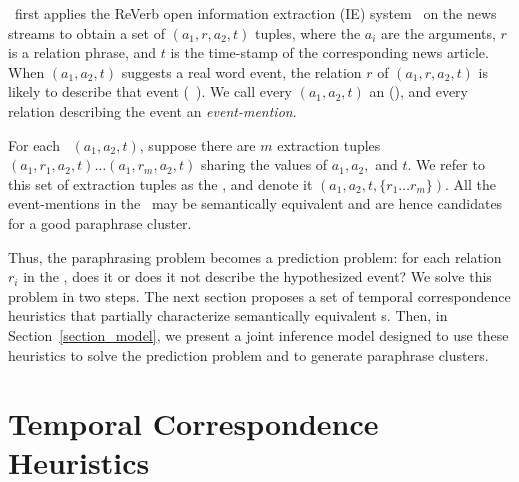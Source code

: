 

\sys\ first applies the ReVerb open information extraction (IE)
system~\cite{fader11} on the news streams to obtain a set of
$(a_1,r,a_2,t)$ tuples, where the $a_i$ are the arguments, $r$ is a
relation phrase, and $t$ is the time-stamp of the corresponding news
article. When $(a_1,a_2,t)$ suggests a real word event, the relation
$r$ of $(a_1,r,a_2,t)$ is likely to describe that event
(\eg\ ). We call
every $(a_1, a_2, t)$ an {\em \Eec} (\eec), and every relation describing the
event an {\em event-mention}.

For each \eec\ $(a_1,a_2,t)$, suppose there are $m$ extraction tuples
$(a_1,r_1,a_2,t)\ldots (a_1,r_m,a_2,t)$ sharing the values of $a_1,
a_2,$ and $t$. We refer to this set of extraction tuples as the {\em
  \bag}, and denote it $(a_1,a_2,t,\{r_1\ldots r_m\})$. All the
event-mentions in the \bag\ may be semantically equivalent and are
hence candidates for a good paraphrase cluster.

Thus, the paraphrasing problem becomes a prediction problem:
for each relation $r_i$ in the \bag, does it or does it not describe
the hypothesized event?  We solve this problem in two steps. The next
section proposes a set of temporal correspondence heuristics that
partially characterize semantically equivalent \bag s. Then, in
Section~\ref{section_model}, we present a joint inference model
designed to use these heuristics to solve the prediction problem and
to generate paraphrase clusters.





\section{Temporal Correspondence Heuristics}
\label{section_temporal}
\theoremstyle{plain} \newtheorem{hypothesis}{H}



\newtheorem*{H1}{Temporal Functionality Heuristic}
\newtheorem*{H2}{Temporal Burstiness Heuristic}
\newtheorem*{H3}{One Event-Mention Per Discourse Heuristic}



